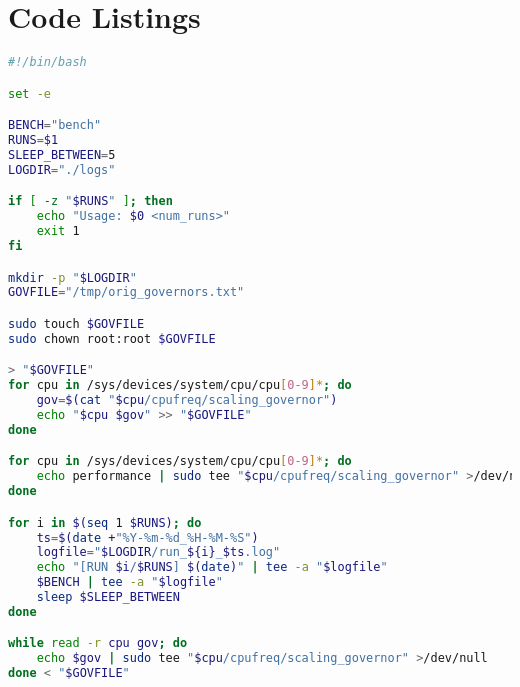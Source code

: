 \section{Code Listings}

\begin{lstlisting}[language=bash,caption={Automation script for benchmark runs},
label={lst:run-measurements}]
#!/bin/bash

set -e

BENCH="bench"
RUNS=$1
SLEEP_BETWEEN=5
LOGDIR="./logs"

if [ -z "$RUNS" ]; then
    echo "Usage: $0 <num_runs>"
    exit 1
fi

mkdir -p "$LOGDIR"
GOVFILE="/tmp/orig_governors.txt"

sudo touch $GOVFILE
sudo chown root:root $GOVFILE

> "$GOVFILE"
for cpu in /sys/devices/system/cpu/cpu[0-9]*; do
    gov=$(cat "$cpu/cpufreq/scaling_governor")
    echo "$cpu $gov" >> "$GOVFILE"
done

for cpu in /sys/devices/system/cpu/cpu[0-9]*; do
    echo performance | sudo tee "$cpu/cpufreq/scaling_governor" >/dev/null
done

for i in $(seq 1 $RUNS); do
    ts=$(date +"%Y-%m-%d_%H-%M-%S")
    logfile="$LOGDIR/run_${i}_$ts.log"
    echo "[RUN $i/$RUNS] $(date)" | tee -a "$logfile"
    $BENCH | tee -a "$logfile"
    sleep $SLEEP_BETWEEN
done

while read -r cpu gov; do
    echo $gov | sudo tee "$cpu/cpufreq/scaling_governor" >/dev/null
done < "$GOVFILE"
\end{lstlisting}
\clearpage

